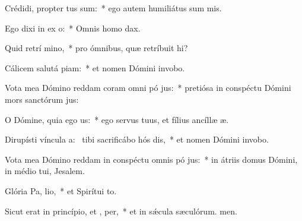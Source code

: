 \item Crédidi, propter  tus sum:~* ego autem humiliátus sum mis.
\item Ego dixi in ex o:~* Omnis homo dax.
\item Quid retrí mino,~* pro ómnibus, quæ retríbuit hi?
\item Cálicem salutá piam:~* et nomen Dómini invobo.
\item Vota mea Dómino reddam coram omni pó jus:~* pretiósa in conspéctu Dómini mors sanctórum jus:
\item O Dómine, quia ego  us:~* ego servus tuus, et fílius ancíllæ æ.
\item Dirupísti víncula a:~\pscross{} tibi sacrificábo hós dis,~* et nomen Dómini invobo.
\item Vota mea Dómino reddam in conspéctu omnis pó jus:~* in átriis domus Dómini, in médio tui, Jesalem.
\item Glória Pa,  lio,~* et Spirítui to.
\item Sicut erat in princípio, et ,  per,~* et in sǽcula sæculórum. men.
